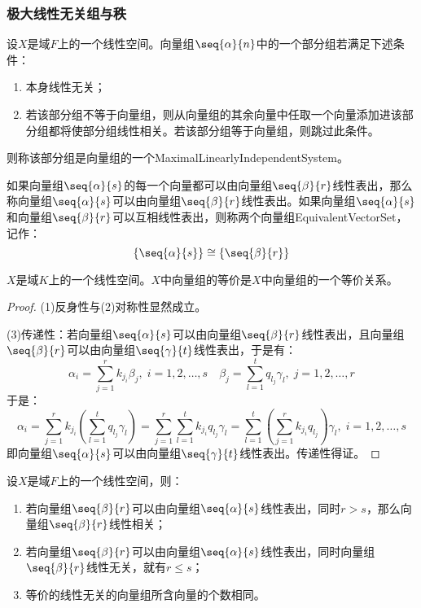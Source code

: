 \subsubsection{极大线性无关组与秩}
\begin{definition}
	设$X$是域$F$上的一个线性空间。向量组$\seq{\alpha}{n}$中的一个部分组若满足下述条件：
	\begin{enumerate}
		\item 本身线性无关；
		\item 若该部分组不等于向量组，则从向量组的其余向量中任取一个向量添加进该部分组都将使部分组线性相关。若该部分组等于向量组，则跳过此条件。
	\end{enumerate}
	则称该部分组是向量组的一个\gls{MaximalLinearlyIndependentSystem}。
\end{definition}
\begin{definition}
	如果向量组$\seq{\alpha}{s}$的每一个向量都可以由向量组$\seq{\beta}{r}$线性表出，那么称向量组$\seq{\alpha}{s}$可以由向量组$\seq{\beta}{r}$线性表出。如果向量组$\seq{\alpha}{s}$和向量组$\seq{\beta}{r}$可以互相线性表出，则称两个向量组\gls{EquivalentVectorSet}，记作：
	\begin{equation*}
		\{\seq{\alpha}{s}\}\cong\{\seq{\beta}{r}\}
	\end{equation*}
\end{definition}
\begin{theorem}
	$X$是域$K$上的一个线性空间。$X$中向量组的等价是$X$中向量组的一个等价关系。
\end{theorem}
\begin{proof}
	(1)反身性与(2)对称性显然成立。\par
	(3)传递性：若向量组$\seq{\alpha}{s}$可以由向量组$\seq{\beta}{r}$线性表出，且向量组$\seq{\beta}{r}$可以由向量组$\seq{\gamma}{t}$线性表出，于是有：
	\begin{equation*}
		\alpha_i=\sum_{j=1}^{r}k_{j_i}\beta_j,\;i=1,2,\dots,s\quad
		\beta_j=\sum_{l=1}^{t}q_{l_j}\gamma_l,\;j=1,2,\dots,r
	\end{equation*}
	于是：
	\begin{equation*}
		\alpha_i=\sum_{j=1}^{r}k_{j_i}\left(\sum_{l=1}^{t}q_{l_j}\gamma_l\right)=\sum_{j=1}^{r}\sum_{l=1}^{t}k_{j_i}q_{l_j}\gamma_l=\sum_{l=1}^{t}\left(\sum_{j=1}^{r}k_{j_i}q_{l_j}\right)\gamma_l,\;i=1,2,\dots,s
	\end{equation*}
	即向量组$\seq{\alpha}{s}$可以由向量组$\seq{\gamma}{t}$线性表出。传递性得证。
\end{proof}
\begin{theorem}\label{theo:LinearlyIndependentNum}
	设$X$是域$F$上的一个线性空间，则：
	\begin{enumerate}
		\item 若向量组$\seq{\beta}{r}$可以由向量组$\seq{\alpha}{s}$线性表出，同时$r>s$，那么向量组$\seq{\beta}{r}$线性相关；
		\item 若向量组$\seq{\beta}{r}$可以由向量组$\seq{\alpha}{s}$线性表出，同时向量组$\seq{\beta}{r}$线性无关，就有$r\leqslant s$；
		\item 等价的线性无关的向量组所含向量的个数相同。
	\end{enumerate}
\end{theorem}
